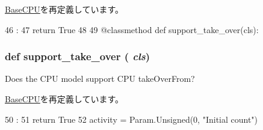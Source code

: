 \hyperlink{classBaseCPU_1_1BaseCPU_afcb2c5440cbf782e304bdb958eadf744}{BaseCPU}を再定義しています。


\begin{DoxyCode}
46                            :
47         return True
48 
49     @classmethod
    def support_take_over(cls):
\end{DoxyCode}
\hypertarget{classO3CPU_1_1DerivO3CPU_aa201537acf29724056129b8efad43371}{
\subsubsection[{support\_\-take\_\-over}]{\setlength{\rightskip}{0pt plus 5cm}def support\_\-take\_\-over ( {\em cls})}}
\label{classO3CPU_1_1DerivO3CPU_aa201537acf29724056129b8efad43371}
\begin{DoxyVerb}Does the CPU model support CPU takeOverFrom?\end{DoxyVerb}
 

\hyperlink{classBaseCPU_1_1BaseCPU_aa201537acf29724056129b8efad43371}{BaseCPU}を再定義しています。


\begin{DoxyCode}
50                               :
51         return True
52 
    activity = Param.Unsigned(0, "Initial count")
\end{DoxyCode}


